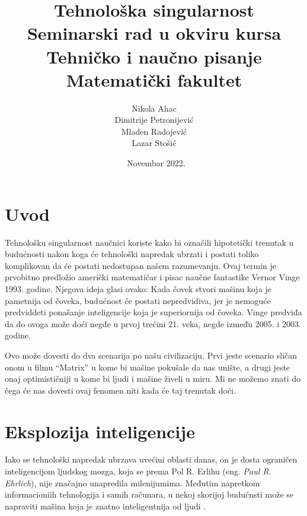 \documentclass[a4paper]{article}
\begin{document}
\title{Tehnološka singularnost\\ \small{Seminarski rad u okviru kursa\\Tehničko i naučno pisanje\\ Matematički fakultet}}

\author{Nikola Ahac\\ Dimitrije Petronijević\\ Mladen Radojević\\ Lazar Stošić}
\date{~Novembar 2022.}
\maketitle



\tableofcontents

\newpage

\section{Uvod}
\label{sec:uvod}
Tehnološku singularnost naučnici koriste kako bi označili hipotetički trenutak u budućnosti nakon koga će tehnološki napredak ubrzati i postati toliko komplikovan da će postati nedostupan našem razumevanju. Ovaj termin je prvobitno predložio američki matematičar i pisac naučne fantastike Vernor Vinge 1993. godine. Njegova ideja glasi ovako: Kada čovek stvori mašinu koja je pametnija od čoveka, budućnost će postati nepredvidiva, jer je nemoguće predviddeti ponašanje inteligencije koja je superiornija od čoveka. Vinge predviđa da do ovoga može doći negde u prvoj trećini 21. veka, negde između 2005. i 2003. godine. 

Ovo može dovesti do dva scenarija po našu civilizaciju. Prvi jeste scenario sličan onom u filmu “Matrix” u kome bi mašine pokušale da nas unište, a drugi jeste onaj optimističniji u kome bi ljudi i mašine živeli u miru. Mi ne možemo znati do čega će nas dovesti ovaj fenomen niti kada će taj trenutak doći.

\section{Eksplozija inteligencije}
Iako se tehnološki napredak ubrzava uvećini oblasti danas, on je dosta ograničen inteligencijom ljudskog mozga, koja se prema Pol R. Erlihu (eng. \textit{Paul R. Ehrlich}), nije značajno unapredila milenijumima.\cite{ref 1} Međutim napretkom informacioniih tehnologija i samih računara, u nekoj skorijoj budućnsti može se napraviti mašina koja je znatno inteligentnija od ljudi .
\end{document}
